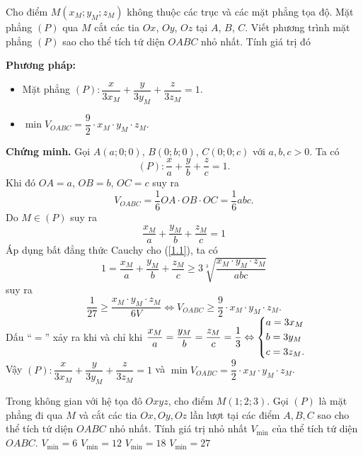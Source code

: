 \begin{dang}{}
	{Cho điểm $ M(x_M;y_M;z_M) $ không thuộc các trục và các mặt phẳng tọa độ. Mặt phẳng $ (P) $ qua $ M $ cắt các tia $ Ox $, $ Oy $, $ Oz $ tại $ A $, $ B $, $ C $. Viết phương trình mặt phẳng $ (P) $ sao cho thể tích tứ diện $ OABC $ nhỏ nhất. Tính giá trị đó}
	
	\textbf{Phương pháp:} 
	\begin{itemize}
		\item Mặt phẳng $ (P)\colon \dfrac{x}{3x_M}+\dfrac{y}{3y_M}+\dfrac{z}{3z_M}=1$.
		\item $ \min V_{OABC}=\dfrac{9}{2}\cdot x_M\cdot y_M\cdot z_M$.
	\end{itemize}
	
	\textbf{Chứng minh.} Gọi $ A(a;0;0) $, $ B(0;b;0) $, $ C(0;0;c) $ với $ a,b,c>0 $. Ta có 
	\[(P)\colon\dfrac{x}{a}+\dfrac{y}{b}+\dfrac{z}{c}=1.\]
	Khi đó $ OA=a $, $ OB=b $, $ OC=c $ suy ra 
	\[V_{OABC}=\dfrac{1}{6}OA\cdot OB\cdot OC=\dfrac{1}{6}abc.\]
	Do $ M\in (P) $ suy ra 
	\begin{equation}\label{1.1}
	\dfrac{x_M}{a}+\dfrac{y_M}{b}+\dfrac{z_M}{c} = 1
	\end{equation}
	Áp dụng bất đẳng thức Cauchy cho (\ref{1.1}),  ta có
	\[1=\dfrac{x_M}{a}+\dfrac{y_M}{b}+\dfrac{z_M}{c}\ge3\sqrt[3]{\dfrac{x_M\cdot y_M\cdot z_M}{abc}}\]
	suy ra \[\dfrac{1}{27}\ge \dfrac{x_M\cdot y_M\cdot z_M}{6V}\Leftrightarrow V_{OABC}\ge\dfrac{9}{2}\cdot x_M\cdot y_M\cdot z_M.\]
	Dấu ``$ = $'' xảy ra khi và chỉ khi $ \dfrac{x_M}{a}=\dfrac{y_M}{b}=\dfrac{z_M}{c} = \dfrac{1}{3} \Leftrightarrow\left\{\begin{aligned}&a=3x_M\\&b=3y_M\\&c=3z_M.\end{aligned}\right.$\\
	Vậy $ (P)\colon \dfrac{x}{3x_M}+\dfrac{y}{3y_M}+\dfrac{z}{3z_M}=1$ và $ \min V_{OABC}=\dfrac{9}{2}\cdot x_M\cdot y_M\cdot z_M$.
\end{dang}




\begin{vd}%
	Trong không gian với hệ tọa đô $Oxyz$, cho điểm $M(1;2;3)$. Gọi $(P)$ là mặt phẳng đi qua $M$ và cắt các tia $Ox,Oy,Oz$ lần lượt tại các điểm $A,B,C$ sao cho  thể tích tứ diện $OABC$ nhỏ nhất. Tính giá trị nhỏ nhất $ V_{\min} $ của thể tích tứ diện $OABC$.
	\choice
	{$ V_{\min} =6$}
	{$ V_{\min} =12$}
	{$ V_{\min} =18$}
	{\True $ V_{\min} =27$}
\end{vd}

